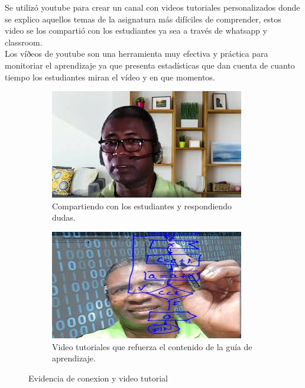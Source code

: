 \documentclass[a4pa<per,12pt,spanish]{article}
\begin{document}
Se utilizó youtube  para crear un  canal con videos tutoriales personalizados donde se  explico aquellos temas de la asignatura más difíciles de comprender, estos video se los compartió  con los estudiantes  ya sea a través de  whatsapp y classroom.\\

Los víðeos de youtube son una herramienta muy efectiva y práctica para monitoriar el aprendizaje ya que  presenta estadísticas que dan cuenta de cuanto tiempo los estudiantes miran el vídeo y en que momentos.



\begin{figure}[h]
\begin{subfigure}{0.45\textwidth}
    \centering
    \includegraphics[scale=0.5]{images/stalin1.jpg}
    
    \caption[tutorias]{Compartiendo con los estudiantes y respondiendo dudas.}
    \label{fig:1}
\end{subfigure} \hspace{2cm}
\begin{subfigure}{0.45\linewidth}
\includegraphics[scale=0.5]{images/stalin2.jpg}
    \caption[videotutorias]{Video tutoriales que refuerza el contenido de la guía de aprendizaje.}
    \label{fig:1}

\end{subfigure}


\caption{Evidencia de conexion y video tutorial}
\label{fig:xx}
\end{figure}
\end{document}
